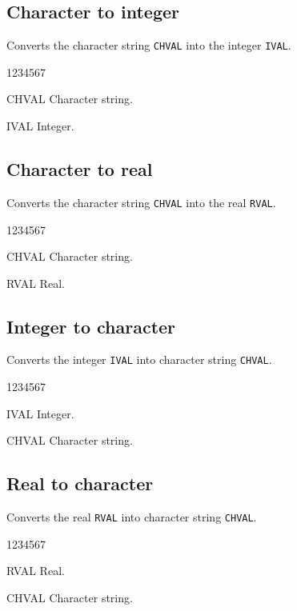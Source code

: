 \subsection{Character to integer}
\Action
Converts the character string {\tt CHVAL} into the integer {\tt IVAL}.
\Pdesc
\begin{DLtt}{1234567}
\item[CHVAL] Character string.
\item[IVAL] Integer.
\end{DLtt}

\subsection{Character to real}
\Action
Converts the character string {\tt CHVAL} into the real {\tt RVAL}.
\Pdesc
\begin{DLtt}{1234567}
\item[CHVAL] Character string.
\item[RVAL] Real.
\end{DLtt}
\subsection{Integer to character}
\Action
Converts the integer {\tt IVAL} into character string {\tt CHVAL}.
\Pdesc
\begin{DLtt}{1234567}
\item[IVAL] Integer.
\item[CHVAL] Character string.
\end{DLtt}
\subsection{Real to character}
\Action
Converts the real {\tt RVAL} into character string {\tt CHVAL}.
\Pdesc
\begin{DLtt}{1234567}
\item[RVAL] Real.
\item[CHVAL] Character string.
\end{DLtt}
